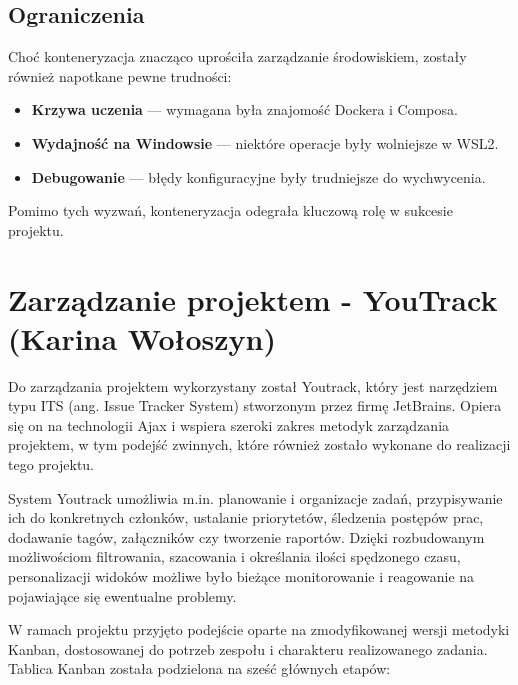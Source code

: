 \subsection{Ograniczenia}

Choć konteneryzacja znacząco uprościła zarządzanie środowiskiem, zostały również napotkane pewne trudności:

\begin{itemize}
  \item \textbf{Krzywa uczenia} — wymagana była znajomość Dockera i Composa.
  \item \textbf{Wydajność na Windowsie} — niektóre operacje były wolniejsze w WSL2.
  \item \textbf{Debugowanie} — błędy konfiguracyjne były trudniejsze do wychwycenia.
\end{itemize}

Pomimo tych wyzwań, konteneryzacja odegrała kluczową rolę w sukcesie projektu.

\section{Zarządzanie projektem - YouTrack (Karina Wołoszyn)}

Do zarządzania projektem wykorzystany został Youtrack, który jest narzędziem typu ITS (ang. Issue Tracker System) stworzonym przez firmę JetBrains. Opiera się on na technologii Ajax i wspiera szeroki zakres metodyk zarządzania projektem, w tym podejść zwinnych, które również zostało wykonane do realizacji tego projektu.

System Youtrack umożliwia m.in. planowanie i organizacje zadań, przypisywanie ich do konkretnych członków, ustalanie priorytetów, śledzenia postępów prac, dodawanie tagów, załączników czy tworzenie raportów. Dzięki rozbudowanym możliwościom filtrowania, szacowania i określania ilości spędzonego czasu, personalizacji widoków możliwe było bieżące monitorowanie i reagowanie na pojawiające się ewentualne problemy. 

W ramach projektu przyjęto podejście oparte na zmodyfikowanej wersji metodyki Kanban, dostosowanej do potrzeb zespołu i charakteru realizowanego zadania. Tablica Kanban została podzielona na sześć głównych etapów:

